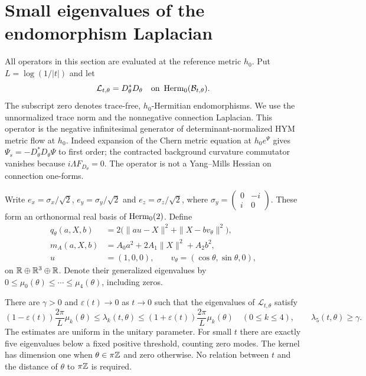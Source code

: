 \section{Small eigenvalues of the endomorphism Laplacian}\label{sec:spectrum}

All operators in this section are evaluated at the reference metric $h_0$.
Put $L=\log(1/|t|)$ and let
\[
 \mathcal L_{t,\theta}=D_\theta^*D_\theta
 \quad\hbox{on }\operatorname{Herm}_0(\mathcal B_{t,\theta}).
\]
The subscript zero denotes trace-free, $h_0$-Hermitian endomorphisms.
We use the unnormalized trace norm and the nonnegative connection
Laplacian. This operator is the negative infinitesimal generator of
determinant-normalized HYM metric flow at $h_0$. Indeed expansion of
the Chern metric equation at $h_0e^{\Psi}$ gives
$\Psi_s=-D_\theta^*D_\theta\Psi$ to first order; the contracted background
curvature commutator vanishes because $i\Lambda F_{D_\theta}=0$.
The operator is not a Yang--Mills Hessian on connection one-forms.

Write $e_x=\sigma_x/\sqrt2$, $e_y=\sigma_y/\sqrt2$ and
$e_z=\sigma_z/\sqrt2$, where
$\sigma_y=\left(\begin{smallmatrix}0&-i\\i&0\end{smallmatrix}\right)$.
These form an orthonormal real basis of $\operatorname{Herm}_0(2)$. Define
\begin{equation}\label{eq:five-forms}
 \begin{split}
 q_\theta(a,X,b)&=2\bigl(\|au-X\|^2+\|X-bv_\theta\|^2\bigr),\\
 m_A(a,X,b)&=A_0a^2+2A_1\|X\|^2+A_2b^2,\\
 u&=(1,0,0),\qquad v_\theta=(\cos\theta,\sin\theta,0),
 \end{split}
\end{equation}
on $\mathbb R\oplus\mathbb R^3\oplus\mathbb R$. Denote their generalized eigenvalues
by $0\le\mu_0(\theta)\le\cdots\le\mu_4(\theta)$, including zeros.

\begin{theorem}\label{thm:five-spectrum}
There are $\gamma>0$ and $\varepsilon(t)\to0$ as $t\to0$ such that
the eigenvalues of $\mathcal L_{t,\theta}$ satisfy
\begin{equation}\label{eq:five-relative}
 (1-\varepsilon(t))\frac{2\pi}{L}\mu_k(\theta)
 \le\lambda_k(t,\theta)\le
 (1+\varepsilon(t))\frac{2\pi}{L}\mu_k(\theta)
 \quad(0\le k\le4),\qquad \lambda_5(t,\theta)\ge\gamma.
\end{equation}
The estimates are uniform in the unitary parameter. For small $t$ there
are exactly five eigenvalues below a fixed positive threshold, counting
zero modes. The kernel has dimension one when $\theta\in\pi\mathbb Z$ and
zero otherwise. No relation between $t$ and the distance of $\theta$
to $\pi\mathbb Z$ is required.
\end{theorem}

